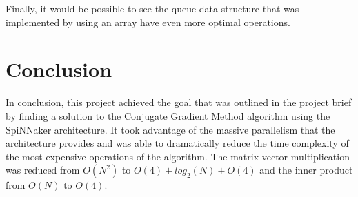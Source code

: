 \documentclass[12pt,twosided]{article}
\begin{document}
Finally, it would be possible to see the queue data structure that was implemented by using an array have even more optimal operations.

\section{Conclusion}
In conclusion, this project achieved the goal that was outlined in the project brief by finding a solution to the Conjugate Gradient Method algorithm using the SpiNNaker architecture. It took advantage of the massive parallelism that the architecture provides and was able to dramatically reduce the time complexity of the most expensive operations of the algorithm. The matrix-vector multiplication was reduced from $O(N^2)$ to $O(4) + log_2(N) + O(4)$ and the inner product from $O(N)$ to $O(4)$. 
\end{document}
